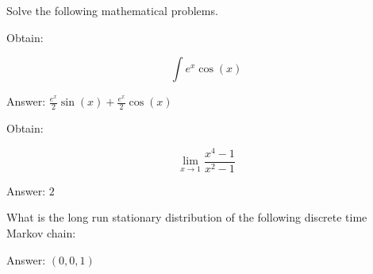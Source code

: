 \documentclass{article}
\begin{document}
\begin{center}
    Solve the following mathematical problems.
\end{center}

\hrulefill
\begin{multicols}{2}

    Obtain:

    \[
        \int{e^{x}\cos(x)}
    \]

    \columnbreak

    Answer: \(\frac{e^{x}}{2} \sin{\left (x \right )} + \frac{e^{x}}{2} \cos{\left (x \right )}\)

\end{multicols}

\hrulefill
\begin{multicols}{2}

    Obtain:

    \[
        \lim_{x\to 1}\frac{x ^ 4 - 1}{x ^ 2 - 1}
    \]

    \columnbreak

        Answer: \( 2 \)

\end{multicols}


\hrulefill
\begin{multicols}{2}

    What is the long run stationary distribution of the following discrete time
    Markov chain:

    \begin{center}
    \end{center}

    \columnbreak

    Answer: \( (0, 0, 1) \)

\end{multicols}
\end{document}
